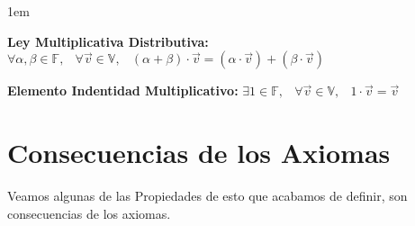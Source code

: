 \documentclass[12pt]{report}                                    %
\newenvironment{Indentation}[1][0.75em]                         %
    {\begin{adjustwidth}{#1}{}}                                     %
    {\end{adjustwidth}}                                             %
\DeclareMathOperator \Space {\quad}                             %
\DeclareMathOperator \MiniSpace {\;}                            %
\begin{document}
\begin{Indentation}[1em]
\begin{itemize}
{                \item 
                    \textbf{Ley Multiplicativa Distributiva:}
                    $\forall \alpha, \beta \in \mathbb{F}, \MiniSpace
                        \forall \vec{v} \in \mathbb{V}, \MiniSpace
                            (\alpha + \beta) \cdot \vec{v} = 
                                    (\alpha \cdot \vec{v}) + (\beta \cdot \vec{v})$

                \item 
                    \textbf{Elemento Indentidad Multiplicativo:}
                    $\exists 1 \in \mathbb{F}, \MiniSpace
                        \forall \vec{v} \in \mathbb{V}, \MiniSpace 1 \cdot \vec{v} = \vec{v}$

            }
            \end{itemize}
            \end{Indentation}



        \clearpage
        \section{Consecuencias de los Axiomas}

            Veamos algunas de las Propiedades de esto que acabamos de definir, son consecuencias de los 
            axiomas.
\end{document}
